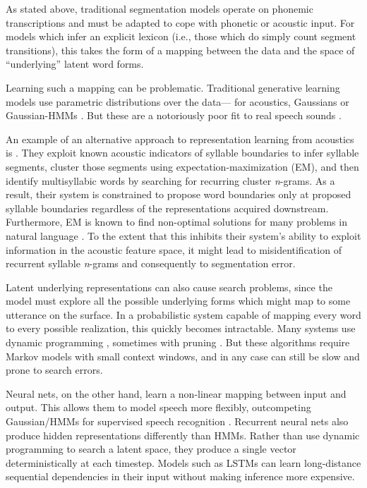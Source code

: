 \documentclass[11pt,letterpaper]{article}
\begin{document}
As stated above, traditional segmentation models operate on phonemic
transcriptions and must be adapted to cope with phonetic or acoustic
input. For models which infer an explicit lexicon (i.e., those which
do simply count segment transitions), this takes the form of a mapping
between the data and the space of ``underlying'' latent word
forms.

Learning such a mapping can be problematic. Traditional generative
learning models use parametric distributions over the data--- for
acoustics, Gaussians \cite{Vallabha07,Feldman09} or Gaussian-HMMs
\cite{Lee12,Lee15}. But these are a notoriously poor fit to real speech sounds
\cite{Glass?}.

An example of an alternative approach to representation learning from acoustics is .
They exploit known acoustic indicators of syllable boundaries to infer syllable segments, cluster those segments using expectation-maximization (EM), and then identify multisyllabic words by searching for recurring cluster \textit{n}-grams.
As a result, their system is constrained to propose word boundaries only at proposed syllable boundaries regardless of the representations acquired downstream.
Furthermore, EM is known to find non-optimal solutions for many problems in natural language \cite{Johnson07}.
To the extent that this inhibits their system's ability to exploit information in the acoustic feature space, it might lead to misidentification of recurrent syllable \textit{n}-grams and consequently to segmentation error.

Latent underlying representations can also cause search problems,
since the model must explore all the possible underlying forms which
might map to some utterance on the surface. In a probabilistic system
capable of mapping every word to every possible realization, this
quickly becomes intractable. Many systems use dynamic programming
\cite{Mochihashi09,Neubig10}, sometimes with pruning
\cite{vanGael08}. But these algorithms require Markov models with
small context windows, and in any case can still be slow and prone to
search errors.

Neural nets, on the other hand, learn a non-linear mapping between
input and output. This allows them to model speech more flexibly,
outcompeting Gaussian/HMMs for supervised speech recognition
\cite{Graves13,Hinton12}. Recurrent neural nets also produce hidden
representations differently than HMMs. Rather than use dynamic
programming to search a latent space, they produce a single vector
deterministically at each timestep. Models such as LSTMs
\cite{Hochreiter97} can learn long-distance sequential dependencies in
their input without making inference more expensive.
\end{document}
